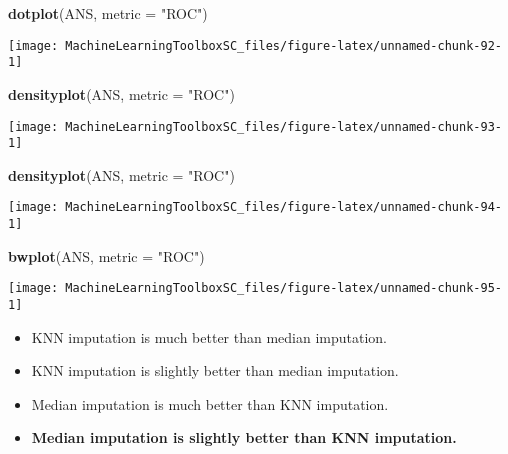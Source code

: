 \documentclass[
]{book}
\newenvironment{Shaded}{\begin{snugshade}}{\end{snugshade}}
\newcommand{\DataTypeTok}[1]{\textcolor[rgb]{0.13,0.29,0.53}{#1}}
\newcommand{\KeywordTok}[1]{\textcolor[rgb]{0.13,0.29,0.53}{\textbf{#1}}}
\newcommand{\NormalTok}[1]{#1}
\newcommand{\StringTok}[1]{\textcolor[rgb]{0.31,0.60,0.02}{#1}}
\begin{document}
\begin{Shaded}
\begin{Highlighting}[]
\KeywordTok{dotplot}\NormalTok{(ANS, }\DataTypeTok{metric =} \StringTok{"ROC"}\NormalTok{)}
\end{Highlighting}
\end{Shaded}

\begin{center}\texttt{[image: MachineLearningToolboxSC\_files/figure-latex/unnamed-chunk-92-1]} \end{center}

\begin{Shaded}
\begin{Highlighting}[]
\KeywordTok{densityplot}\NormalTok{(ANS, }\DataTypeTok{metric =} \StringTok{"ROC"}\NormalTok{)}
\end{Highlighting}
\end{Shaded}

\begin{center}\texttt{[image: MachineLearningToolboxSC\_files/figure-latex/unnamed-chunk-93-1]} \end{center}

\begin{Shaded}
\begin{Highlighting}[]
\KeywordTok{densityplot}\NormalTok{(ANS, }\DataTypeTok{metric =} \StringTok{"ROC"}\NormalTok{)}
\end{Highlighting}
\end{Shaded}

\begin{center}\texttt{[image: MachineLearningToolboxSC\_files/figure-latex/unnamed-chunk-94-1]} \end{center}

\begin{Shaded}
\begin{Highlighting}[]
\KeywordTok{bwplot}\NormalTok{(ANS, }\DataTypeTok{metric =} \StringTok{"ROC"}\NormalTok{)}
\end{Highlighting}
\end{Shaded}

\begin{center}\texttt{[image: MachineLearningToolboxSC\_files/figure-latex/unnamed-chunk-95-1]} \end{center}

\begin{itemize}
\item
  KNN imputation is much better than median imputation.
\item
  KNN imputation is slightly better than median imputation.
\item
  Median imputation is much better than KNN imputation.
\item
  \textbf{Median imputation is slightly better than KNN imputation.}
\end{itemize}
\end{document}
